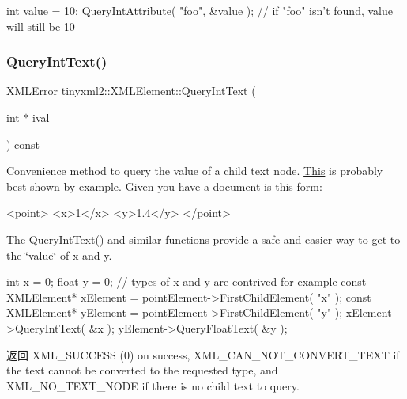 \begin{DoxyVerb}int value = 10;
QueryIntAttribute( "foo", &value );     // if "foo" isn't found, value will still be 10
\end{DoxyVerb}
 \mbox{\label{classtinyxml2_1_1_x_m_l_element_a926357996bef633cb736e1a558419632}} 
\subsubsection{\texorpdfstring{Query\+Int\+Text()}{QueryIntText()}}
{\footnotesize\ttfamily X\+M\+L\+Error tinyxml2\+::\+X\+M\+L\+Element\+::\+Query\+Int\+Text (\begin{DoxyParamCaption}\item[{int $\ast$}]{ival }\end{DoxyParamCaption}) const}

Convenience method to query the value of a child text node. \hyperlink{namespace_this}{This} is probably best shown by example. Given you have a document is this form\+: \begin{DoxyVerb}    <point>
        <x>1</x>
        <y>1.4</y>
    </point>
\end{DoxyVerb}


The \hyperlink{classtinyxml2_1_1_x_m_l_element_a926357996bef633cb736e1a558419632}{Query\+Int\+Text()} and similar functions provide a safe and easier way to get to the \char`\"{}value\char`\"{} of x and y.

\begin{DoxyVerb}    int x = 0;
    float y = 0;    // types of x and y are contrived for example
    const XMLElement* xElement = pointElement->FirstChildElement( "x" );
    const XMLElement* yElement = pointElement->FirstChildElement( "y" );
    xElement->QueryIntText( &x );
    yElement->QueryFloatText( &y );
\end{DoxyVerb}


\begin{DoxyReturn}{返回}
X\+M\+L\+\_\+\+S\+U\+C\+C\+E\+SS (0) on success, X\+M\+L\+\_\+\+C\+A\+N\+\_\+\+N\+O\+T\+\_\+\+C\+O\+N\+V\+E\+R\+T\+\_\+\+T\+E\+XT if the text cannot be converted to the requested type, and X\+M\+L\+\_\+\+N\+O\+\_\+\+T\+E\+X\+T\+\_\+\+N\+O\+DE if there is no child text to query. 
\end{DoxyReturn}
\mbox{\label{classtinyxml2_1_1_x_m_l_element_a1f9c2cd61b72af5ae708d37b7ad283ce}} 
